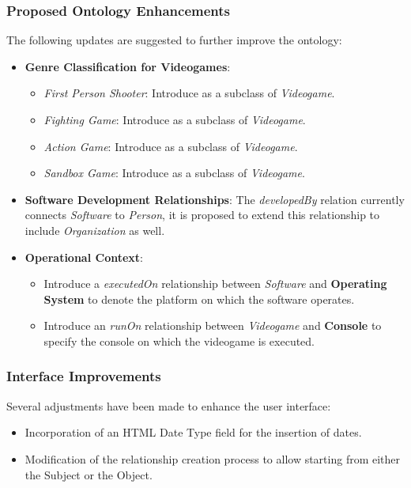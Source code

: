 \subsubsection{Proposed Ontology Enhancements}

The following updates are suggested to further improve the ontology:

\begin{itemize}
    \item \textbf{Genre Classification for Videogames}:
    \begin{itemize}
        \item \textit{First Person Shooter}: Introduce as a subclass of \textit{Videogame}.
        \item \textit{Fighting Game}: Introduce as a subclass of \textit{Videogame}.
        \item \textit{Action Game}: Introduce as a subclass of \textit{Videogame}.
        \item \textit{Sandbox Game}: Introduce as a subclass of \textit{Videogame}.
    \end{itemize}
    \item \textbf{Software Development Relationships}: The \textit{developedBy} relation currently connects \textit{Software} to \textit{Person}, it is proposed to extend this relationship to include \textit{Organization} as well.
    \item \textbf{Operational Context}:
    \begin{itemize}
        \item Introduce a \textit{executedOn} relationship between \textit{Software} and \textbf{Operating System} to denote the platform on which the software operates.
        \item Introduce an \textit{runOn} relationship between \textit{Videogame} and \textbf{Console} to specify the console on which the videogame is executed.
    \end{itemize}
\end{itemize}

\subsubsection{Interface Improvements}

Several adjustments have been made to enhance the user interface:

\begin{itemize}
    \item Incorporation of an HTML Date Type field for the insertion of dates.
    \item Modification of the relationship creation process to allow starting from either the Subject or the Object.
\end{itemize}